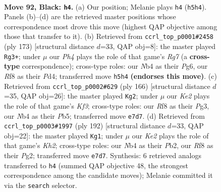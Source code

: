 \documentclass[11pt]{article}
\begin{document}
\clearpage

\begin{figure}[p]\centering
\begin{subfigure}{0.46\textwidth}\centering
\resizebox{\linewidth}{!}{%
\newchessgame
\chessboard[
  setfen={5r2/4kp2/6p1/4P2p/bnB2Pp1/8/3N2KP/8 b - - 43 92},
  showmover=false,
  pgfstyle=straightmove, color=movearrow, markmove={h5-h4}
]}
\caption{}
\end{subfigure}\hfill
\begin{subfigure}{0.46\textwidth}\centering
\resizebox{\linewidth}{!}{%
\newchessgame
\chessboard[
  setfen={3B4/7p/p3B1pP/2k2p2/2Pp1P2/3K4/6r1/8 b - - 3 87},
  showmover=false,
  pgfstyle=straightmove, color=movearrow, markmove={g2-g3}
]}
\caption{}
\end{subfigure}
\\[4pt]
\begin{subfigure}{0.46\textwidth}\centering
\resizebox{\linewidth}{!}{%
\newchessgame
\chessboard[
  setfen={8/2b5/4pkp1/1P5p/5P1P/5KP1/2B5/8 w - - 0 84},
  showmover=false,
  pgfstyle=straightmove, color=movearrow, markmove={f3-g2}
]}
\caption{}
\end{subfigure}\hfill
\begin{subfigure}{0.46\textwidth}\centering
\resizebox{\linewidth}{!}{%
\newchessgame
\chessboard[
  setfen={5B2/8/4b3/1p5k/1P3p1p/5P1P/1P4PK/8 w - - 64 97},
  showmover=false,
  pgfstyle=straightmove, color=movearrow, markmove={h2-g1}
]}
\caption{}
\end{subfigure}
\caption{\textbf{Move 92, Black: \texttt{h4}.} (a) Our position; Melanie plays \texttt{h4} (\texttt{h5h4}). Panels (b)--(d) are the retrieved master positions whose correspondence most drove this move (highest QAP objective among those that transfer to it). (b) Retrieved from \texttt{ccrl\_top\_p0001\#2458} (ply 173) [structural distance $d$=33, QAP obj=8]: the master played \texttt{Rg3+}; under $\mu$ our \emph{Ph4} plays the role of that game's \emph{Rg7} (a \textbf{cross-type} correspondence); cross-type roles: our \emph{N}b4 as their \emph{P}g6, our \emph{R}f8 as their \emph{P}d4; transferred move \texttt{h5h4} \textbf{(endorses this move)}. (c) Retrieved from \texttt{ccrl\_top\_p0002\#629} (ply 166) [structural distance $d$=35, QAP obj=26]: the master played \texttt{Kg2}; under $\mu$ our \emph{Ke2} plays the role of that game's \emph{Kf3}; cross-type roles: our \emph{R}f8 as their \emph{P}g3, our \emph{N}b4 as their \emph{P}b5; transferred move \texttt{e7d7}. (d) Retrieved from \texttt{ccrl\_top\_p0003\#1997} (ply 192) [structural distance $d$=33, QAP obj=22]: the master played \texttt{Kg1}; under $\mu$ our \emph{Ke2} plays the role of that game's \emph{Kh2}; cross-type roles: our \emph{N}b4 as their \emph{P}b2, our \emph{R}f8 as their \emph{P}g2; transferred move \texttt{e7d7}. Synthesis: 6 retrieved analogs transferred to \texttt{h4} (summed QAP objective 48, the strongest correspondence among the candidate moves); Melanie committed it via the \texttt{search} selector.}
\label{fig:thought-m183}
\end{figure}
\end{document}
